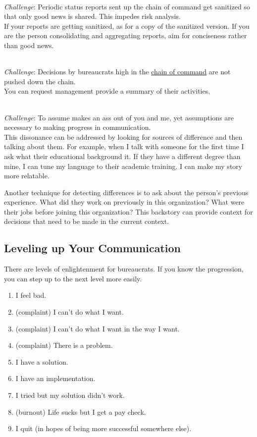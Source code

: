 \ \\
\textit{Challenge}: Periodic status reports sent up the chain of command get sanitized so that only good news is shared. This impedes risk analysis. \\
If your reports are getting sanitized, as for a copy of the sanitized version. If you are the person consolidating and aggregating reports, aim for conciseness rather than good news. 

\ \\
\textit{Challenge}: Decisions by bureaucrats high in the \href{https://en.wikipedia.org/wiki/Command_hierarchy}{chain of command} are not pushed down the chain. \\
You can request management provide a summary of their activities.

\ \\
\textit{Challenge}: To assume makes an ass out of you and me, 
yet assumptions are necessary to making progress in communication.\\ 
This dissonance can be addressed by looking for sources of difference and then talking about them. For example, when I talk with someone for the first time I ask what their educational background it. If they have a different degree than mine, I can tune my language to their academic training. I can make my story more relatable. 

Another technique for detecting differences is to ask about the person's previous experience. What did they work on previously in this organization? What were their jobs before joining this organization? This backstory can provide context for decisions that need to be made in the current context. 

\subsection*{Leveling up Your Communication}

There are levels of enlightenment for bureaucrats. If you know the progression, you can step up to the next level more easily.
\begin{enumerate}
    \item I feel bad.
    \item (complaint) I can't do what I want.
    \item (complaint) I can't do what I want in the way I want.
    \item (complaint) There is a problem.
    \item I have a solution.
    \item I have an implementation.
    \item I tried but my solution didn't work.
    \item (burnout) Life sucks but I get a pay check.
    \item I quit (in hopes of being more successful somewhere else).
\end{enumerate}


